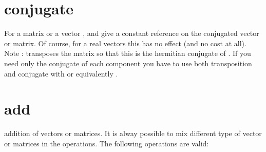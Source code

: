 \documentclass[a4paper,11pt,english]{sphinxmanual}
\begin{document}
\section{conjugate}
\label{\detokenize{gmm/blas:conjugate}}
For a matrix  or a vector ,
 and  give a constant reference on the conjugated vector or matrix. Of course, for a real vectors this has no effect (and no cost at all). Note :  transposes the matrix  so that this is the hermitian conjugate of . If you need only the conjugate of each component you have to use both transposition and conjugate with  or equivalently  .


\section{add}
\label{\detokenize{gmm/blas:add}}
addition of vectors or matrices. It is alway possible to mix different type of vector or matrices in the operations. The following operations are valid:
\end{document}
